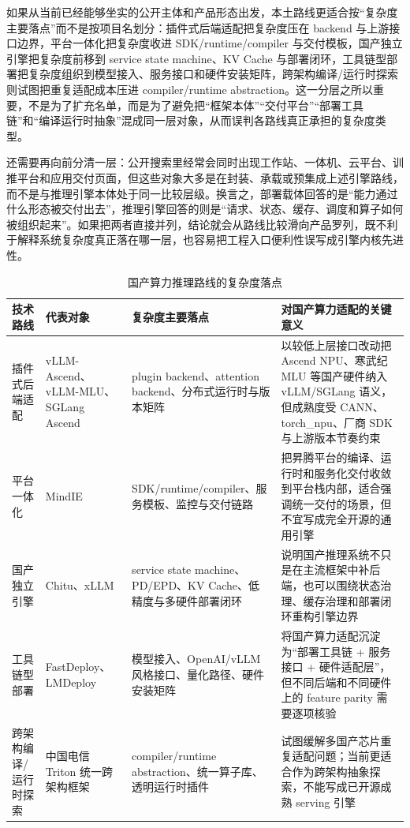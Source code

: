如果从当前已经能够坐实的公开主体和产品形态出发，本土路线更适合按“复杂度主要落点”而不是按项目名划分：插件式后端适配把复杂度压在 backend 与上游接口边界，平台一体化把复杂度收进 SDK/runtime/compiler 与交付模板，国产独立引擎把复杂度前移到 service state machine、KV Cache 与部署闭环，工具链型部署把复杂度组织到模型接入、服务接口和硬件安装矩阵，跨架构编译/运行时探索则试图把重复适配成本压进 compiler/runtime abstraction\citep{vllmascend,vllmmlu,sglang_ascend_npu,mindie,chitu_github,xllm_tech_report,fastdeploy_docs,lmdeploy_install,chinatelecom_triton_validation_2025}。这一分层之所以重要，不是为了扩充名单，而是为了避免把“框架本体”“交付平台”“部署工具链”和“编译运行时抽象”混成同一层对象，从而误判各路线真正承担的复杂度类型。

还需要再向前分清一层：公开搜索里经常会同时出现工作站、一体机、云平台、训推平台和应用交付页面，但这些对象大多是在封装、承载或预集成上述引擎路线，而不是与推理引擎本体处于同一比较层级。换言之，部署载体回答的是“能力通过什么形态被交付出去”，推理引擎回答的则是“请求、状态、缓存、调度和算子如何被组织起来”。如果把两者直接并列，结论就会从路线比较滑向产品罗列，既不利于解释系统复杂度真正落在哪一层，也容易把工程入口便利性误写成引擎内核先进性。

\begin{table}[t]
\centering
\footnotesize
\setlength{\tabcolsep}{4pt}
\caption{国产算力推理路线的复杂度落点}
\label{tab:domestic-route-complexity}
\begin{tabularx}{\textwidth}{>{\raggedright\arraybackslash}p{2.3cm}p{3.0cm}p{3.1cm}X}
\toprule
技术路线 & 代表对象 & 复杂度主要落点 & 对国产算力适配的关键意义 \\
\midrule
插件式后端适配 & vLLM-Ascend、vLLM-MLU、SGLang Ascend\citep{vllmascend,vllmmlu,sglang_ascend_npu} & plugin backend、attention backend、分布式运行时与版本矩阵 & 以较低上层接口改动把 Ascend NPU、寒武纪 MLU 等国产硬件纳入 vLLM/SGLang 语义，但成熟度受 CANN、torch\_npu、厂商 SDK 与上游版本节奏约束 \\
平台一体化 & MindIE\citep{mindie} & SDK/runtime/compiler、服务模板、监控与交付链路 & 把昇腾平台的编译、运行时和服务化交付收敛到平台栈内部，适合强调统一交付的场景，但不宜写成完全开源的通用引擎 \\
国产独立引擎 & Chitu、xLLM\citep{chitu_tsinghua_news,chitu_github,xllm_docs,xllm_service,xllm_tech_report} & service state machine、PD/EPD、KV Cache、低精度与多硬件部署闭环 & 说明国产推理系统不只是在主流框架中补后端，也可以围绕状态治理、缓存治理和部署闭环重构引擎边界 \\
工具链型部署 & FastDeploy、LMDeploy\citep{fastdeploy_docs,lmdeploy_install,lmdeploy_supported_models} & 模型接入、OpenAI/vLLM 风格接口、量化路径、硬件安装矩阵 & 将国产算力适配沉淀为“部署工具链 + 服务接口 + 硬件适配层”，但不同后端和不同硬件上的 feature parity 需要逐项核验 \\
跨架构编译/运行时探索 & 中国电信 Triton 统一跨架构框架\citep{chinatelecom_triton_validation_2025,chinatelecom_wbba_2026} & compiler/runtime abstraction、统一算子库、透明运行时插件 & 试图缓解多国产芯片重复适配问题；当前更适合作为跨架构抽象探索，不能写成已开源成熟 serving 引擎 \\
\bottomrule
\end{tabularx}
\end{table}

